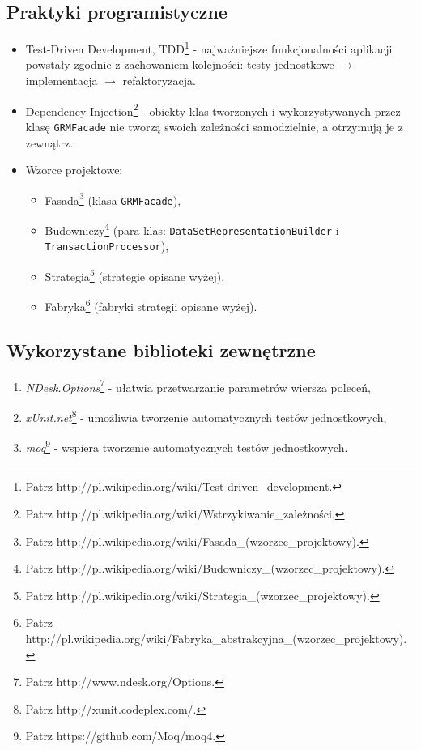 \documentclass[a4paper,10pt]{article}
\begin{document}
 \subsection{Praktyki programistyczne}
 \begin{itemize}
  \item Test-Driven Development, TDD\footnote{Patrz http://pl.wikipedia.org/wiki/Test-driven\_development.} - najważniejsze funkcjonalności aplikacji powstały zgodnie z zachowaniem kolejności: testy jednostkowe $\rightarrow$ implementacja $\rightarrow$ refaktoryzacja.
  \item Dependency Injection\footnote{Patrz http://pl.wikipedia.org/wiki/Wstrzykiwanie\_zależności.} - obiekty klas tworzonych i wykorzystywanych przez klasę \verb+GRMFacade+ nie tworzą swoich zależności samodzielnie, a otrzymują je z zewnątrz.
  \item Wzorce projektowe:
   \begin{itemize}
    \item Fasada\footnote{Patrz http://pl.wikipedia.org/wiki/Fasada\_(wzorzec\_projektowy).} (klasa \verb+GRMFacade+),
    \item Budowniczy\footnote{Patrz http://pl.wikipedia.org/wiki/Budowniczy\_(wzorzec\_projektowy).} (para klas: \verb+DataSetRepresentationBuilder+ i \verb+TransactionProcessor+),
    \item Strategia\footnote{Patrz http://pl.wikipedia.org/wiki/Strategia\_(wzorzec\_projektowy).} (strategie opisane wyżej),
    \item Fabryka\footnote{Patrz http://pl.wikipedia.org/wiki/Fabryka\_abstrakcyjna\_(wzorzec\_projektowy).} (fabryki strategii opisane wyżej).
   \end{itemize}
 \end{itemize}
 
 
 \subsection{Wykorzystane biblioteki zewnętrzne}
 \begin{enumerate}
  \item \emph{NDesk.Options}\footnote{Patrz http://www.ndesk.org/Options.} - ułatwia przetwarzanie parametrów wiersza poleceń,
  \item \emph{xUnit.net}\footnote{Patrz http://xunit.codeplex.com/.} - umożliwia tworzenie automatycznych testów jednostkowych,
  \item \emph{moq}\footnote{Patrz https://github.com/Moq/moq4.} - wspiera tworzenie automatycznych testów jednostkowych.
 \end{enumerate}
\end{document}
